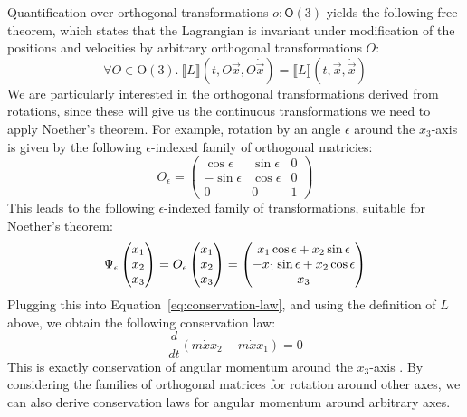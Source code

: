 \documentclass{sigplanconf}
\theoremstyle{examplestyle}
\newcommand{\sem}[1]{\llbracket #1 \rrbracket}
\begin{document}
Quantification over orthogonal transformations $o : \mathsf{O}(3)$
yields the following free theorem, which states that the Lagrangian is
invariant under modification of the positions and velocities by
arbitrary orthogonal transformations $O$:
\begin{displaymath}
  \forall O \in \mathrm{O}(3).~\sem{L}(t, O\vec{x}, O\dot{\vec{x}}) = \sem{L}(t, \vec{x}, \dot{\vec{x}})
\end{displaymath}
We are particularly interested in the orthogonal transformations
derived from rotations, since these will give us the continuous
transformations we need to apply Noether's theorem. For example,
rotation by an angle $\epsilon$ around the $x_3$-axis is given by the
following $\epsilon$-indexed family of orthogonal matricies:
\begin{displaymath}
  O_\epsilon =
  \left(
    \begin{array}{ccc}
      \cos \epsilon  & \sin \epsilon & 0 \\
      -\sin \epsilon & \cos \epsilon & 0 \\
      0 & 0 & 1
    \end{array}
  \right)
\end{displaymath}
This leads to the following $\epsilon$-indexed family of
transformations, suitable for Noether's theorem:
\begin{displaymath}
  \Psi_\epsilon\left(\begin{array}{@{}c@{}} x_1 \\ x_2 \\ x_3 \end{array}\right) =
  O_\epsilon \left(\begin{array}{@{}c@{}} x_1 \\ x_2 \\ x_3 \end{array}\right) =
  \left(\begin{array}{@{}c@{}} x_1 \cos \epsilon + x_2 \sin \epsilon \\ - x_1 \sin \epsilon + x_2 \cos \epsilon \\ x_3 \end{array}\right)
\end{displaymath}
Plugging this into Equation~\ref{eq:conservation-law}, and using the
definition of $L$ above, we obtain the following conservation law:
\begin{displaymath}
  \frac{d}{dt}(m\dot{x}x_2 - m\dot{x}x_1) = 0
\end{displaymath}
This is exactly conservation of angular momentum around the $x_3$-axis
\cite{landau60mechanics}. By considering the families of orthogonal
matrices for rotation around other axes, we can also derive
conservation laws for angular momentum around arbitrary axes.
\end{document}

